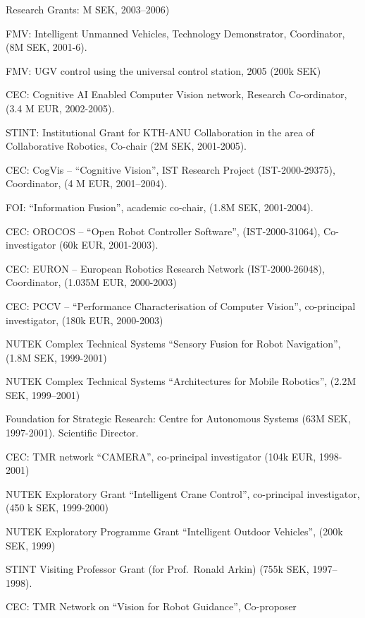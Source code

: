 \documentclass{article}
\begin{document}
\begin{cv}
\begin{cvlist}{Research Grants:}
  M SEK, 2003--2006) %
\item FMV: Intelligent Unmanned Vehicles, Technology Demonstrator,
  Coordinator, (8M SEK, 2001-6). %
\item FMV: UGV control using the universal control station, 2005 (200k
  SEK) %
\item CEC: Cognitive AI Enabled Computer Vision network, Research
  Co-ordinator, (3.4 M EUR, 2002-2005). %
\item STINT: Institutional Grant for KTH-ANU Collaboration in the area
  of Collaborative Robotics, Co-chair (2M SEK, 2001-2005).%
\item CEC: CogVis -- ``Cognitive Vision'', IST Research Project
  (IST-2000-29375), Coordinator, (4 M EUR, 2001--2004).%
\item FOI: ``Information Fusion'', academic co-chair,  (1.8M SEK, 2001-2004).%
\item CEC: OROCOS -- ``Open Robot Controller Software'',
  (IST-2000-31064), Co-investigator (60k EUR, 2001-2003).%
\item CEC: EURON -- European Robotics Research Network
  (IST-2000-26048), Coordinator, (1.035M EUR, 2000-2003)%
\item CEC: PCCV -- ``Performance Characterisation of Computer
  Vision'',  co-principal investigator, (180k EUR, 2000-2003)%
\item NUTEK Complex Technical Systems ``Sensory Fusion for Robot
  Navigation'', (1.8M SEK, 1999-2001)%
\item NUTEK Complex Technical Systems ``Architectures for Mobile
  Robotics'', (2.2M SEK, 1999--2001)%
\item Foundation for Strategic Research: Centre for Autonomous Systems
  (63M SEK, 1997-2001). Scientific Director.%
\item CEC: TMR network ``CAMERA'', co-principal investigator  (104k
  EUR, 1998-2001)%
\item NUTEK Exploratory Grant ``Intelligent Crane Control'',
  co-principal investigator, (450 k SEK, 1999-2000)%
\item NUTEK Exploratory Programme Grant ``Intelligent Outdoor
  Vehicles'', (200k SEK, 1999)%
\item STINT Visiting Professor Grant (for Prof.\ Ronald Arkin)  (755k
  SEK, 1997--1998).%
\item CEC: TMR Network on ``Vision for Robot Guidance'', Co-proposer

\end{cvlist}
\end{cv}
\end{document}
